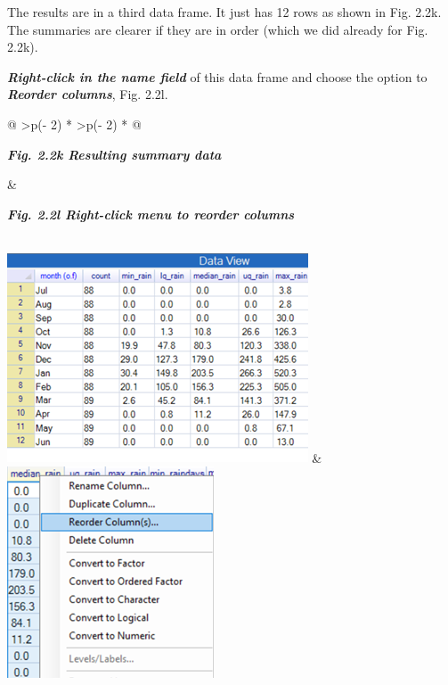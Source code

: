 \documentclass[
  letterpaper,
  DIV=11,
  numbers=noendperiod]{scrreprt}
\begin{document}
The results are in a third data frame. It just has 12 rows as shown in
Fig. 2.2k. The summaries are clearer if they are in order (which we did
already for Fig. 2.2k).

\textbf{\emph{Right-click in the name field}} of this data frame and
choose the option to \textbf{\emph{Reorder columns}}, Fig. 2.2l.

\begin{longtable}[]{@{}
  >{\centering\arraybackslash}p{(\columnwidth - 2\tabcolsep) * }
  >{\centering\arraybackslash}p{(\columnwidth - 2\tabcolsep) * }@{}}
\toprule\noalign{}
\begin{minipage}[b]{\linewidth}\centering
\textbf{\emph{Fig. 2.2k Resulting summary data}}
\end{minipage} & \begin{minipage}[b]{\linewidth}\centering
\textbf{\emph{Fig. 2.2l Right-click menu to reorder columns}}
\end{minipage} \\
\midrule\noalign{}
\endhead
\bottomrule\noalign{}
\endlastfoot
\includegraphics[width=3.517in,height=2.443in]{figures/Fig2.2k.png} &
\includegraphics[width=2.419in,height=2.464in]{figures/Fig2.2l.png} \\
\end{longtable}
\end{document}
